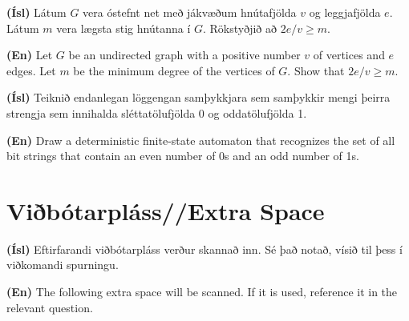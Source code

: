 \documentclass[addpoints]{exam}
\begin{document}
\begin{questions}

\newpage
\question[10] 
\textbf{(Ísl)} Látum $G$ vera óstefnt net með jákvæðum hnútafjölda $v$ og leggjafjölda $e$. Látum $m$ vera lægsta stig hnútanna í $G$. Rökstyðjið að $2e/v \geq m$.


\textbf{(En)} Let $G$ be an undirected graph with a positive number $v$ of vertices and $e$ edges. Let $m$ be the minimum degree of the vertices of $G$. Show that $2e/v \geq m$.



\newpage
\question[10]

\textbf{(Ísl)} Teiknið endanlegan löggengan samþykkjara sem samþykkir mengi þeirra strengja sem innihalda sléttatölufjölda 0 og oddatölufjölda 1.

\textbf{(En)} Draw a deterministic finite-state automaton that recognizes the set of all bit strings that contain an even number of 0s and an odd number of 1s.


\end{questions}

\newpage

\section{Viðbótarpláss//Extra Space}

\textbf{(Ísl)} Eftirfarandi viðbótarpláss verður skannað inn. Sé það notað, vísið til þess í viðkomandi spurningu.

\textbf{(En)} The following extra space will be scanned. If it is used, reference it in the relevant question.

\newpage
{}
\end{document}
